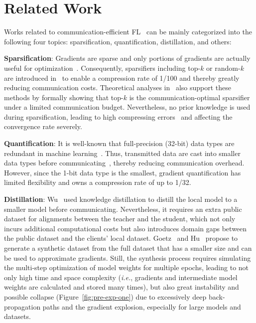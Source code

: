 \section{Related Work}
\label{sec:related-work}
Works related to communication-efficient FL~\cite{chen2021communication} can be mainly categorized into the following four topics: sparsification, quantification, distillation, and others:

\noindent\textbf{Sparsification}: 
Gradients are sparse and only portions of gradients are actually useful for optimization~\cite{aji2017sparse}.
Consequently, sparsifiers including top-$k$ or random-$k$ are introduced in~\cite{aji2017sparse,lin2017deep,wangni2018gradient} to enable a compression rate of 1/100 and thereby greatly reducing communication costs.
Theoretical analyses in~\cite{sahu2021rethinking} also support these methods by formally showing that top-$k$ is the communication-optimal sparsifier under a limited communication budget. 
Nevertheless, no prior knowledge is used during sparsification, leading to high compressing errors~\cite{alistarh2018convergence} and affecting the convergence rate severely.

\noindent\textbf{Quantification}: 
It is well-known that full-precision (32-bit) data types are redundant in machine learning~\cite{denil2013predicting}.
Thus, transmitted data are cast into smaller data types before communicating~\cite{bernstein2018signsgd,alistarh2017qsgd,seide20141}, thereby reducing communication overhead.
However, since the 1-bit data type is the smallest, gradient quantification has limited flexibility and owns a compression rate of up to 1/32.

\noindent\textbf{Distillation}:
Wu~\cite{wu2022communication} used knowledge distillation to distill the local model to a smaller model before communicating. 
Nevertheless, it requires an extra public dataset for alignments between the teacher and the student, which not only incurs additional computational costs but also introduces domain gaps between the public dataset and the clients' local dataset.
Goetz~\cite{goetz2020federated} and Hu~\cite{hu2022fedsynth} propose to generate a synthetic dataset from the full dataset that has a smaller size and can be used to approximate gradients.
Still, the synthesis process requires simulating the multi-step optimization of model weights for multiple epochs, leading to not only high time and space complexity (\textit{i.e.}, gradients and intermediate model weights are calculated and stored many times), but also great instability and possible collapse (Figure~\ref{fig:pre-exp-one}) due to excessively deep back-propagation paths and the gradient explosion, especially for large models and datasets.

